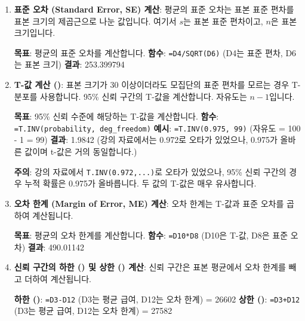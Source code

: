 \documentclass[11pt,a4paper]{article}
\theoremstyle{definition}
\newcommand{\code}[1]{\texttt{#1}}
\begin{document}
\begin{enumerate}
\begin{enumerate}
\begin{enumerate}
    \item \textbf{표준 오차 (Standard Error, SE) 계산}:
    평균의 표준 오차는 표본 표준 편차를 표본 크기의 제곱근으로 나눈 값입니다.
    여기서 $s$는 표본 표준 편차이고, $n$은 표본 크기입니다.
    \begin{examplebox}[title=Excel 표준 오차 계산]
        \textbf{목표}: 평균의 표준 오차를 계산합니다.
        \textbf{함수}: \code{=D4/SQRT(D6)} (D4는 표준 편차, D6는 표본 크기)
        \textbf{결과}: 253.399794
    \end{examplebox}

    \item \textbf{T-값 계산 ()}:
    표본 크기가 30 이상이더라도 모집단의 표준 편차를 모르는 경우 T-분포를 사용합니다. 95\% 신뢰 구간의 T-값을 계산합니다. 자유도는 $n-1$입니다.
    \begin{examplebox}[title=Excel T.INV 함수 사용법]
        \textbf{목표}: 95\% 신뢰 수준에 해당하는 T-값을 계산합니다.
        \textbf{함수}: \code{=T.INV(probability, deg\_freedom)}
        \textbf{예시}: \code{=T.INV(0.975, 99)} (자유도 = 100 - 1 = 99)
        \textbf{결과}: 1.9842 (강의 자료에서는 0.972로 오타가 있었으나, 0.975가 올바른 값이며 t-값은 거의 동일합니다.)
    \end{examplebox}
    \begin{warningbox}
        \textbf{주의}: 강의 자료에서 \code{T.INV(0.972,...)}로 오타가 있었으나, 95\% 신뢰 구간의 경우 누적 확률은 0.975가 올바릅니다. 두 값의 T-값은 매우 유사합니다.
    \end{warningbox}

    \item \textbf{오차 한계 (Margin of Error, ME) 계산}:
    오차 한계는 T-값과 표준 오차를 곱하여 계산됩니다.
    \begin{examplebox}[title=Excel 오차 한계 계산]
        \textbf{목표}: 평균의 오차 한계를 계산합니다.
        \textbf{함수}: \code{=D10*D8} (D10은 T-값, D8은 표준 오차)
        \textbf{결과}: 490.01142
    \end{examplebox}

    \item \textbf{신뢰 구간의 하한 () 및 상한 () 계산}:
    신뢰 구간은 표본 평균에서 오차 한계를 빼고 더하여 계산됩니다.
    \begin{examplebox}[title=Excel 신뢰 구간 계산]
        \textbf{하한 ()}: \code{=D3-D12} (D3는 평균 급여, D12는 오차 한계) = 26602
        \textbf{상한 ()}: \code{=D3+D12} (D3는 평균 급여, D12는 오차 한계) = 27582
    \end{examplebox}


\end{enumerate}
\end{enumerate}
\end{enumerate}
\end{document}
